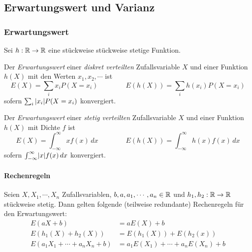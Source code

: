         \subsection{Erwartungswert und Varianz}
            \subsubsection{Erwartungswert}
                Sei \( h : \mathbb{R} \rightarrow \mathbb{R} \) eine stückweise stückweise stetige Funktion.
            
                Der \textit{Erwartungswert} einer \textit{diskret verteilten} Zufallsvariable \(X\) und einer Funktion \( h(X) \) mit den Werten \( x_1, x_2, \cdots \) ist
                \begin{equation*}
                    E(X) = \sum_{i} x_i P(X = x_i) \qquad\qquad E(h(X)) = \sum_i h(x_i) P(X = x_i)
                \end{equation*}
                sofern \( \sum_i \abs{x_i} P(X = x_i) \) konvergiert.
                
                Der \textit{Erwartungswert} einer \textit{stetig verteilten} Zufallsvariable \(X\) und einer Funktion \( h(X) \) mit Dichte \(f\) ist
                \begin{equation*}
                    E(X) = \int_{-\infty}^{\infty} \! x f(x) \, dx \qquad\qquad E(h(X)) = \int_{-\infty}^{\infty} \! h(x) f(x) \, dx
                \end{equation*}
                sofern \( \int_{-\infty}^{\infty} \! \abs{x} f(x) \, dx \) konvergiert.

                \paragraph{Rechenregeln}
                    Seien \(X, X_1, \cdots, X_n\) Zufallsvariablen, \( b, a, a_1, \cdots, a_n \in \mathbb{R} \) und \( h_1, h_2 : \mathbb{R} \rightarrow \mathbb{R} \) stückweise stetig. Dann gelten folgende (teilweise redundante) Rechenregeln für den Erwartungswert:
                    \begin{align*}
                    	E(aX + b)                       & = aE(X) + b                          \\
                    	E(h_1(X) + h_2(X))              & = E(h_1(X)) + E(h_2(x))              \\
                    	E(a_1X_1 + \cdots + a_nX_n + b) & = a_1E(X_1) + \cdots + a_nE(X_n) + b
                    \end{align*}

